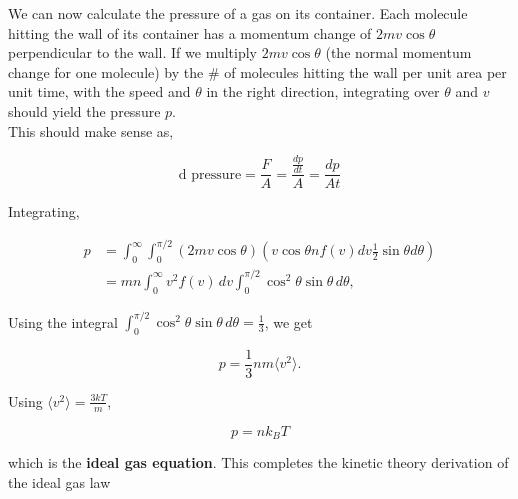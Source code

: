 \documentclass[svgnames]{article}     %
\begin{document}
We can now calculate the pressure of a gas on its container. Each molecule
hitting the wall of its container has a momentum change of $2mv \cos \theta$
perpendicular to the wall. If we multiply $2mv\cos\theta$ (the normal momentum
change for one molecule) by the \# of molecules hitting the wall per unit area
per unit time, with the speed and $\theta$ in the right direction, integrating
over $\theta$ and $v$ should yield the pressure $p$. \\

This should make sense as, 

\[
\text{d pressure} = \frac{F}{A} = \frac{\frac{dp}{dt}}{A} = \frac{dp}{At}
\] \vspace{5px}

Integrating, 

\begin{align*}
  p &= \int_{0}^{\infty} \int_{0}^{\pi/2}  (2mv\cos\theta) \left( v\cos\theta
  n f(v) dv \frac{1}{2}\sin\theta d\theta \right) \\
    &= mn \int_{0}^{\infty} v^2 f(v) \, dv \int_{0}^{\pi/2} \cos^2\theta
    \sin\theta \, d\theta,
\end{align*}  

Using the integral $\int_{0}^{\pi/2} \cos^2\theta\sin\theta \, d\theta
= \frac{1}{3}$, we get

\[
  \boxed{p = \frac{1}{3}nm\langle v^2 \rangle.}
\] \vspace{5px}

Using $\langle v^2 \rangle = \frac{3kT}{m}$, 

\[
  \boxed{p = nk_BT}
\] \vspace{5px}

which is the \textbf{ideal gas equation}. This completes the kinetic theory
derivation of the ideal gas law
\end{document}
